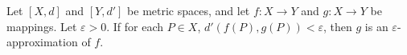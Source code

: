 Let $[X, d]$ and $[Y, d']$ be metric spaces, and let $f: X \rightarrow Y$ and $g: X \rightarrow Y$ be mappings. Let $\varepsilon > 0$. If for each $P \in X$, $d'(f(P), g(P)) < \varepsilon$, then $g$ is an $\varepsilon$-approximation of $f$.
